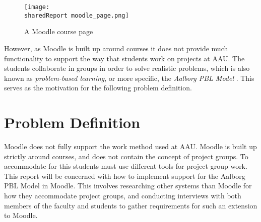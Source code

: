 \begin{figure}
\texttt{[image: \\sharedReport moodle\_page.png]}
\caption{A Moodle course page}
\label{fig:MoodleCourse}
\end{figure}

However, as Moodle is built up around courses it does not provide much functionality to support the way that students work on projects at AAU. 
The students collaborate in groups in order to solve realistic problems, which is also known as \emph{problem-based learning}, or more specific, the \emph{Aalborg PBL Model} \citep{pbl}. This serves as the motivation for the following problem definition.

\section{Problem Definition}
\label{sec:problemDef}
Moodle does not fully support the work method used at AAU. 
Moodle is built up strictly around courses, and does not contain the concept of project groups. 
To accommodate for this students must use different tools for project group work.
This report will be concerned with how to implement support for the Aalborg PBL Model in Moodle. 
This involves researching other systems than Moodle for how they accommodate project groups, and conducting interviews with both members of the faculty and students to gather requirements for such an extension to Moodle.